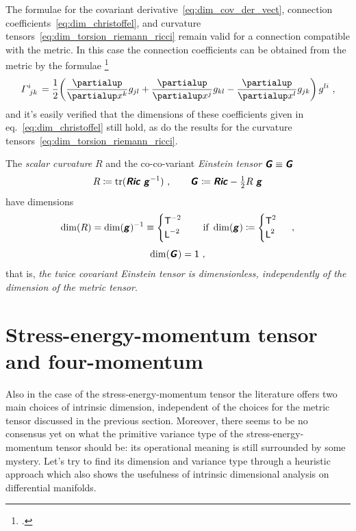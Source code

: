 \documentclass[\ifafour a4paper,12pt,\else a5paper,10pt,\fi%
onecolumn,oneside,article,%
british%
]{memoir}
\makeatletter
\theoremstyle{remark}
\theoremstyle{innote}
\newcommand*{\mathte}[1]{\textbf{\textit{\textsf{#1}}}}
\newcommand*{\citep}{\footcites}
\newcommand*{\de}{\partialup}%
\DeclareMathOperator{\tr}{tr}%
\newcommand*{\defd}{\coloneqq}
\renewcommand*{\|}[1][]{\nonscript\,#1\vert\nonscript\;\mathopen{}}
\newcommand*{\sect}{\S}%
\newcommand*{\eqn}{eq.}%
\newcommand*{\q}{}%
\DeclareRobustCommand*{\q}{%
  \mathord{\mathpalette\bigcdot@{}}%
}
\newcommand*{\bigcdot@scalefactor}{0.7}
\newcommand*{\bigcdot@widthfactor}{1.5}
\newcommand*{\bigcdot@}[2]{%
  \sbox0{$#1\vcenter{}$}%
  \sbox2{$#1\cdot\m@th$}%
  \hbox to \bigcdot@widthfactor\wd2{%
    \hfil
    \raise\ht0\hbox{%
      \scalebox{\bigcdot@scalefactor}{%
        \lower\ht0\hbox{$#1\bullet\m@th$}%
      }%
    }%
    \hfil
  }%
}
\newcommand*{\Un}{\textsf{1}}
\newcommand*{\Le}{\textsf{L}}
\newcommand*{\Ti}{\textsf{T}}
\newcommand*{\yg}{\mathte{g}}
\newcommand*{\yG}{\mathte{G}}
\newcommand*{\yRi}{\mathte{Ric}}
\newcommand*{\ysc}{R}
\renewcommand*{\i}{\indices}
\newcommand*{\dex}[1][i]{\frac{\de}{\de x^{#1}}}
\newcommand*{\yGa}{\varGamma}
\makeatother
\begin{document}
\bigskip


The formulae for the covariant derivative~\eqref{eq:dim_cov_der_vect},
connection coefficients~\eqref{eq:dim_christoffel}, and curvature
tensors~\eqref{eq:dim_torsion_riemann_ricci} remain valid for a connection
compatible with the metric. In this case the connection coefficients can be
obtained from the metric by the formulae
\citep[\sect~V.B.2]{choquetbruhatetal1977_r1996}
\begin{equation}
  \label{eq:christoffel_g}
  \yGa\i{^{i}_{jk}} = \frac{1}{2}
  \biggl(\dex[k]g_{jl} + \dex[j]g_{kl} - \dex[l]g_{jk}\biggr)\,g^{li} \ ,
\end{equation}
and it's easily verified that the dimensions of these coefficients given in
\eqn~\eqref{eq:dim_christoffel} still hold, as do the results for the
curvature tensors~\eqref{eq:dim_torsion_riemann_ricci}.

\medskip

The \emph{scalar curvature} $\ysc$ and the co-co-variant \emph{Einstein
  tensor} $\yG \equiv \yG\i{_{\q\q}}$
\begin{equation}
  \label{eq:curv_einst}
  \ysc \defd %
  \tr(\yRi\ \yg^{-1})
  \ ,
  \qquad
  \yG\i{_{\q\q}} \defd \yRi -%
  \tfrac{1}{2} \ysc\ \yg %
\end{equation}
have  dimensions
\begin{gather}
  \label{eq:dim_scalcurv}
  \dim(\ysc) = \dim(\yg)^{-1} \equiv
  \begin{cases}
    \Ti^{-2} \\
    \Le^{-2}
  \end{cases}
  \quad\text{if }\dim(\yg)\defd
  \begin{cases}
     \Ti^2 \\
    \Le^2
  \end{cases}\ ,
  \\[\jot]
  \label{eq:dim_einst}
  \dim(\yG\i{_{\q\q}}) = \Un \ ,
\end{gather}
that is, \emph{the twice covariant Einstein tensor is dimensionless,
  independently of the dimension of the metric tensor}.

\section{Stress-energy-momentum tensor and four-momentum}
\label{sec:stressenergy}

Also in the case of the stress-energy-momentum tensor the literature offers
two main choices of intrinsic dimension, independent of the choices for the
metric tensor discussed in the previous section. Moreover, there seems to
be no consensus yet on what the primitive variance type of the
stress-energy-momentum tensor should be: its operational meaning is still
surrounded by some mystery. Let's try to find its dimension and variance
type through a heuristic approach which also shows the usefulness of
intrinsic dimensional analysis on differential manifolds.
\end{document}
